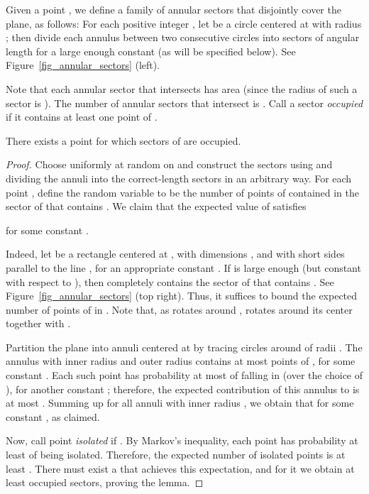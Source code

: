 \documentclass[11pt]{article}
\begin{document}
Given a point , we define a family   of
annular sectors that disjointly cover the plane, as follows:
For each positive integer , let  be a circle
centered at  with radius ; then divide each
annulus between two consecutive circles into sectors of angular
length  for a large enough constant
 (as will be specified below). See
Figure~\ref{fig_annular_sectors} (left).

Note that each annular sector that intersects  has area
 (since the radius of such a sector is ).
The number of annular sectors that intersect  is .
Call a sector \emph{occupied} if it contains at
least one point of .

\begin{lem}\label{lemma3.1} There exists a point 
for which  sectors of  are occupied.
\end{lem}

\begin{proof} Choose  uniformly at random on  and construct the
sectors using  and dividing the annuli into the correct-length sectors in
an arbitrary way.
For each point , define the random variable 
to be the number of points of  contained in the sector of
 that contains . We claim that the expected value
 of  satisfies

for some constant .

Indeed, let  be a rectangle centered at ,
with dimensions , and with
short sides parallel to the line , for an appropriate
constant . If  is large enough (but constant with
respect to ), then  completely contains the sector of
 that contains . See Figure~\ref{fig_annular_sectors} (top right).
Thus, it suffices to bound the
expected number of points of  in . Note that, as 
rotates around ,  rotates around its center together with
.

Partition the plane into annuli centered at  by tracing
circles around  of radii . The annulus
with inner radius  and outer radius  contains at most
 points of , for some constant . Each such
point has probability at most  of falling
in  (over the choice of ), for another constant ;
therefore, the expected contribution of this annulus to
 is at most . Summing up for all
annuli with inner radius , we obtain that
 for some constant , as claimed.

Now, call point  \emph{isolated} if . By
Markov's inequality, each point  has probability at least
 of being isolated. Therefore, the expected number of
isolated points is at least . There must exist a  that
achieves this expectation, and for it we obtain at least
 occupied sectors, proving the lemma.
\end{proof}
\end{document}
